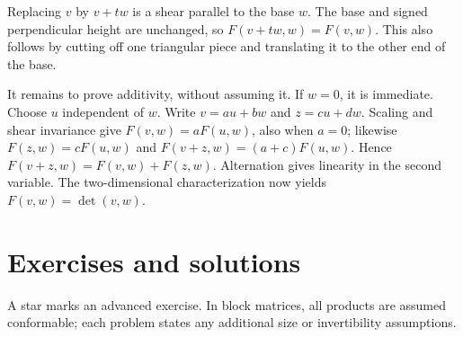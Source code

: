 Replacing \(v\) by \(v+tw\) is a shear parallel to the base \(w\).
The base and signed perpendicular height are unchanged, so
\(F(v+tw,w)=F(v,w)\). This also follows by cutting off one triangular
piece and translating it to the other end of the base.

It remains to prove additivity, without assuming it. If \(w=0\), it is
immediate. Choose \(u\) independent of \(w\). Write
\(v=au+bw\) and \(z=cu+dw\). Scaling and shear invariance give
\(F(v,w)=aF(u,w)\), also when \(a=0\); likewise
\(F(z,w)=cF(u,w)\) and \(F(v+z,w)=(a+c)F(u,w)\).
Hence \(F(v+z,w)=F(v,w)+F(z,w)\). Alternation gives linearity in the
second variable. The two-dimensional characterization now yields
\(F(v,w)=\det(v,w)\).

\clearpage
\section*{Exercises and solutions}
A star marks an advanced exercise. In block matrices, all products are
assumed conformable; each problem states any additional size or
invertibility assumptions.

